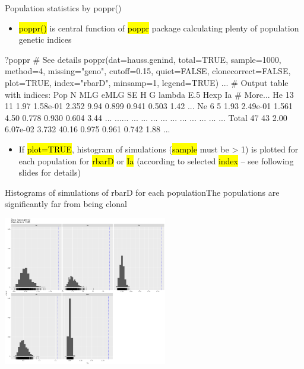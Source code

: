 \documentclass[compress, ucs, xelatex, 11pt, xcolor=svgnames,
  hyperref={
    bookmarks=true,
    unicode=true,
    colorlinks=true,
    pdftitle={Molecular data in R},
    plainpages=false,
    pdfauthor={Vojtech Zeisek},
    pdfsubject={Course about phylogeny and evolution in R},
    pdfcreator={XeLaTeX},
    pdfkeywords={R, evolution, phylogeny, molecular data},
    linkcolor=Tomato,
    anchorcolor=SaddleBrown,
    citecolor=Goldenrod,
    filecolor=DarkMagenta,
    menucolor=Sienna,
    urlcolor=DarkTurquoise,
    pdftex},
  url={hyphens, lowtilde} %
  ]{beamer}
\renewcommand{\texttt}[1]{\hl{\ttfamily #1}}
\begin{document}
\begin{frame}[fragile]{Population statistics by poppr()}
  \vfill
  \begin{itemize}
    \item \texttt{poppr()} is central function of \texttt{poppr} package calculating plenty of population genetic indices
  \end{itemize}
  \vfill
  \begin{spluscode}
    ?poppr # See details
    poppr(dat=hauss.genind, total=TRUE, sample=1000, method=4,
      missing="geno", cutoff=0.15, quiet=FALSE, clonecorrect=FALSE,
      plot=TRUE, index="rbarD", minsamp=1, legend=TRUE)
    ... # Output table with indices:
      Pop  N MLG eMLG       SE     H     G lambda   E.5  Hexp   Ia # More...
       He 13  11 1.97 1.58e-01 2.352  9.94  0.899 0.941 0.503 1.42 ...
       Ne  6   5 1.93 2.49e-01 1.561  4.50  0.778 0.930 0.604 3.44 ...
      ...... ...  ...      ...   ...   ...    ...   ...   ...  ... ...
    Total 47  43 2.00 6.07e-02 3.732 40.16  0.975 0.961 0.742 1.88 ...
  \end{spluscode}
  \vfill
  \begin{itemize}
    \item If \texttt{plot=TRUE}, histogram of simulations (\texttt{sample} must be > 1) is plotted for each population for \texttt{rbarD} or \texttt{Ia} (according to selected \texttt{index} -- see following slides for details)
  \end{itemize}
  \vfill
\end{frame}

\begin{frame}{Histograms of simulations of rbarD for each population}{The populations are significantly far from being clonal}
  \begin{center}
    \includegraphics[height=6.5cm]{poppr.png}
  \end{center}
\end{frame}
\end{document}

